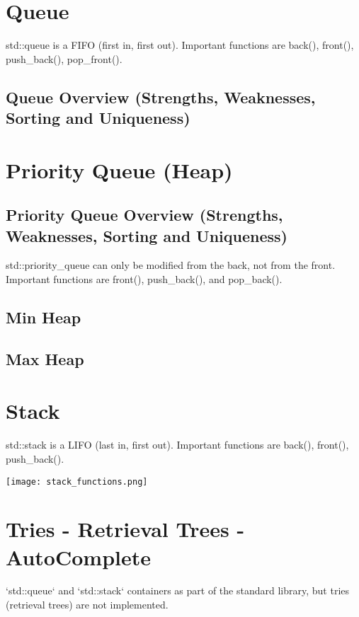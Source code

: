 \section{Queue}
std::queue is a FIFO (first in, first out). Important functions are back(), front(), push\_back(), pop\_front().

\subsection{Queue Overview (Strengths, Weaknesses, Sorting and Uniqueness)}

\section{Priority Queue (Heap)}
\subsection{Priority Queue Overview (Strengths, Weaknesses, Sorting and Uniqueness)}

std::priority\_queue can only be modified from the back, not from the front. Important functions are front(), push\_back(), 
and pop\_back().

\subsection{Min Heap}
\subsection{Max Heap}

\section{Stack}

std::stack is a LIFO (last in, first out). Important functions are back(), front(), push\_back().

\begin{center}
    \texttt{[image: stack\_functions.png]}
\end{center}

\section{Tries - Retrieval Trees - AutoComplete}

`std::queue` and `std::stack` containers as part of the standard library, but tries (retrieval trees) are not implemented. 

